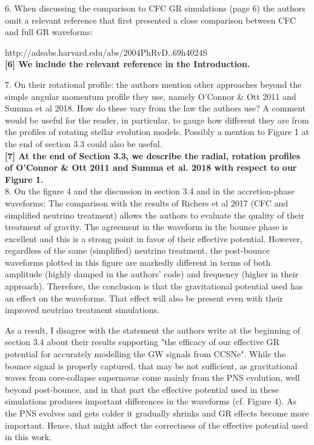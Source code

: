 \documentclass[11pt]{article}
\begin{document}
6. When discussing the comparison to CFC GR simulations (page 6) the authors 
omit a relevant reference that first presented a close comparison between CFC 
and full GR waveforms: 

http://adsabs.harvard.edu/abs/2004PhRvD..69h4024S\\

\textbf{[6] We include the relevant reference in the Introduction.}


7. On their rotational profile: the authors mention other approaches beyond the 
simple angular momentum profile they use, namely O'Connor \& Ott 2011 and Summa et al 2018. How do these vary from the law the authors use? A comment would be useful for the reader, in particular, to gauge how different they are from the profiles of rotating stellar evolution models. Possibly a mention to Figure 1 at the end of section 3.3 could also be useful. \\

\textbf{[7] At the end of Section 3.3, we describe the radial, rotation profiles of O’Connor \& Ott 2011 and Summa et al. 2018 with respect to our Figure 1.}\\

8. On the figure 4 and the discussion in section 3.4 and in the accretion-phase 
waveforms: The comparison with the results of Richers et al 2017 (CFC and
simplified neutrino treatment) allows the authors to evaluate the quality of
their treatment of gravity. The agreement in the waveform in the bounce phase 
is excellent and this is a strong point in favor of their effective potential. 
However, regardless of the same (simplified) neutrino treatment, the post-bounce  waveforms plotted in this figure are markedly different in terms of both amplitude  (highly damped in the authors' code) and frequency (higher in their approach).  Therefore, the conclusion is that the gravitational potential used has an effect on the waveforms. That effect will also be present even with their improved neutrino treatment simulations.

As a result, I disagree with the statement the authors write at the beginning of 
section 3.4 about their results supporting "the efficacy of our effective GR 
potential for accurately modelling the GW signals from CCSNe". While the bounce signal is properly captured, that may be not sufficient, as gravitational waves from core-collapse supernovae come mainly from the PNS evolution, well beyond post-bounce, and in that part the effective potential used in these simulations produces important differences in the waveforms (cf. Figure 4). As the PNS evolves and gets colder it gradually shrinks and GR effects become more important. Hence, that might affect the correctness of the effective potential used in this work.
\end{document}
